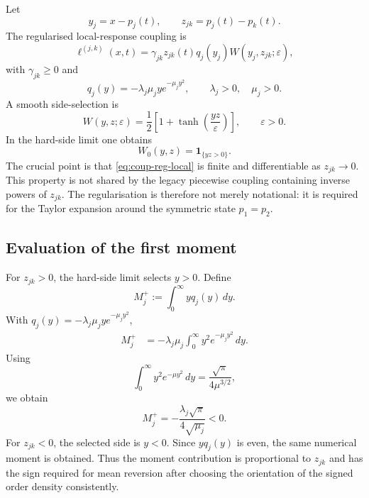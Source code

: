 \documentclass[5p,final]{elsarticle}
\begin{document}
Let
\begin{equation}
y_j=x-p_j(t),
\qquad
z_{jk}=p_j(t)-p_k(t).
\end{equation}
The regularised local-response coupling is
\begin{equation}
\ell^{(j,k)}(x,t)
=\gamma_{jk}z_{jk}(t)q_j(y_j)
W(y_j,z_{jk};\varepsilon),
\label{eq:coup-reg-local}
\end{equation}
with $\gamma_{jk}\geq0$ and
\begin{equation}
q_j(y)=-\lambda_j\mu_j y e^{-\mu_j y^2},
\qquad
\lambda_j>0,\quad \mu_j>0.
\end{equation}
A smooth side-selection is
\begin{equation}
W(y,z;\varepsilon)=\frac12\left[1+\tanh\!\left(\frac{yz}{\varepsilon}\right)\right],
\qquad \varepsilon>0.
\end{equation}
In the hard-side limit one obtains
\begin{equation}
W_0(y,z)=\mathbf 1_{\{yz>0\}}.
\end{equation}
The crucial point is that \eqref{eq:coup-reg-local} is finite and differentiable as $z_{jk}\to0$.  This property is not shared by the legacy piecewise coupling containing inverse powers of $z_{jk}$.  The regularisation is therefore not merely notational: it is required for the Taylor expansion around the symmetric state $p_1=p_2$.

\subsection{Evaluation of the first moment}

For $z_{jk}>0$, the hard-side limit selects $y>0$.  Define
\begin{equation}
M_j^{+}:=\int_{0}^{\infty}yq_j(y)\,dy.
\end{equation}
With $q_j(y)=-\lambda_j\mu_j y e^{-\mu_j y^2}$,
\begin{align}
M_j^{+}
&=-\lambda_j\mu_j\int_0^\infty y^2e^{-\mu_j y^2}\,dy.
\end{align}
Using
\begin{equation}
\int_0^\infty y^2e^{-\mu y^2}\,dy
=\frac{\sqrt\pi}{4\mu^{3/2}},
\end{equation}
we obtain
\begin{equation}
M_j^{+}=-\frac{\lambda_j\sqrt\pi}{4\sqrt{\mu_j}}<0.
\label{eq:moment-explicit}
\end{equation}
For $z_{jk}<0$, the selected side is $y<0$.  Since $yq_j(y)$ is even, the same numerical moment is obtained.  Thus the moment contribution is proportional to $z_{jk}$ and has the sign required for mean reversion after choosing the orientation of the signed order density consistently.
\end{document}
